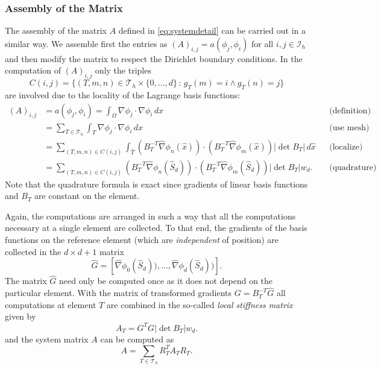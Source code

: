 \documentclass[a4paper,12pt]{article}
\begin{document}
\subsubsection*{Assembly of the Matrix}

The assembly of the matrix $A$ defined in \eqref{eq:systemdetail} can be carried
out in a similar way. We assemble first the entries as $(A)_{i,j}=a(\phi_j,\phi_i)$
for all $i,j\in\mathcal{I}_h$ and then modify the matrix to respect the Dirichlet
boundary conditions. In the computation of $(A)_{i,j}$ only the triples
$$C(i,j) = \{(T,m,n)\in\mathcal{T}_h\times\{0,\ldots,d\} \,:\, g_T(m)=i \wedge g_T(n)=j\}$$
are involved due to the locality of the Lagrange basis functions:
\begin{align*}
(A)_{i,j} &= a(\phi_j,\phi_i) = \int_\Omega \nabla \phi_j \cdot \nabla \phi_i \,dx 
&&\text{(definition)}\\
&= \sum_{T\in\mathcal{T}_h} \int_T \nabla \phi_j \cdot \nabla \phi_i \,dx
&&\text{(use mesh)}\\
&= \sum_{(T,m,n)\in C(i,j)}
\int_{\hat T} (B_T^{-T} \hat\nabla\phi_n(\hat x))\cdot (B_T^{-T} \hat\nabla\phi_m(\hat x))
|\det B_T| \,d\hat x &&\text{(localize)}\\
&= \sum_{(T,m,n)\in C(i,j)}
(B_T^{-T} \hat\nabla\phi_n(\hat S_d))\cdot (B_T^{-T} \hat\nabla\phi_m(\hat S_d))
|\det B_T| w_d . &&\text{(quadrature)}
\end{align*}
Note that the quadrature formula is exact since gradients of linear basis functions
and $B_T$ are constant on the element.

Again, the computations are arranged in such a way that all the computations
necessary at a single element are collected. To that end,
the gradients of the basis functions on the reference element (which are {\em independent}
of position) are collected in the $d\times d+1$ matrix
\begin{equation*}
\hat G = \left[\hat\nabla\phi_0(\hat S_d)),\ldots,\hat\nabla\phi_d(\hat S_d))\right] .
\end{equation*}
The matrix $\hat G$ need only be computed once as it does not depend on the
particular element.
With the matrix of transformed gradients $G=B_T^{-T} \hat G$
all computations at element $T$ are 
combined in the so-called {\em local stiffness matrix} given by
\begin{equation}
A_T = G^T G |\det B_T| w_d .
\label{eq:jacobian_volume}
\end{equation}
and the system matrix $A$ can be computed as
\begin{equation}
A =  \sum_{T\in\mathcal{T}_h} R_T^T A_T R_T .
\label{eq:matrixassembly}
\end{equation}
\end{document}
